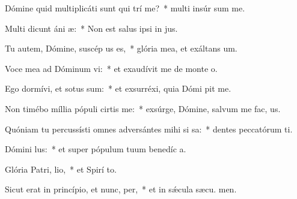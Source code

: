 \item Dómine quid multiplicáti sunt qui trí me?~* multi insúr sum me.
\item Multi dicunt áni æ:~* Non est salus ipsi in  jus.
\item Tu autem, Dómine, suscép us es,~* glória mea, et exáltans  um.
\item Voce mea ad Dóminum vi:~* et exaudívit me de monte  o.
\item Ego dormívi, et sotus sum:~* et exsurréxi, quia Dómi pit me.
\item Non timébo míllia pópuli cirtis me:~* exsúrge, Dómine, salvum me fac,  us.
\item Quóniam tu percussísti omnes adversántes mihi si sa:~* dentes peccatórum ti.
\item Dómini  lus:~* et super pópulum tuum benedíc a.
\item Glória Patri,  lio,~* et Spirí to.
\item Sicut erat in princípio, et nunc,  per,~* et in sǽcula sæcu. men.
